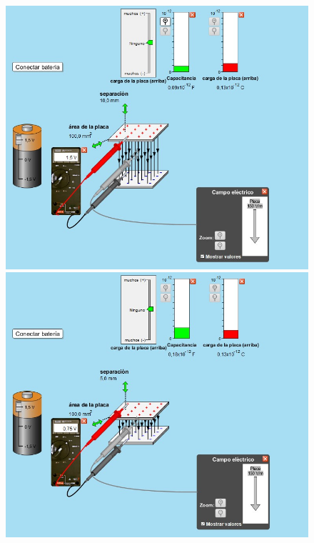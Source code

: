\documentclass[12pt]{report}
\begin{document}
\begin{enumerate}
\begin{enumerate}
      \begin{figure}[h]
          \centering
          \begin{minipage}[h]{0.45\textwidth}
          \centering
          \includegraphics[width=1\textwidth]{./images/3foto1.jpg} 
          \end{minipage}\hfill
          \begin{minipage}[h]{0.45\textwidth}
          \centering
          \includegraphics[width=1\textwidth]{./images/3foto2.jpg} 
       \end{minipage}
      \end{figure}


\end{enumerate}
\end{enumerate}
\end{document}
